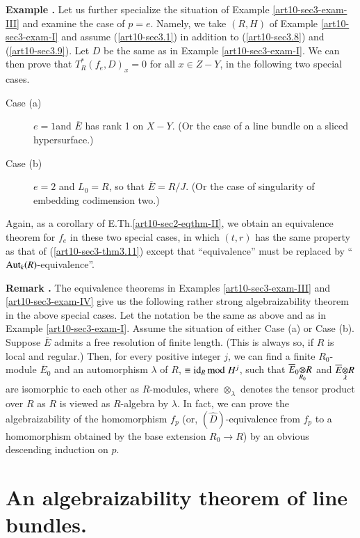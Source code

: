 \medskip
\noindent
{\bf Example .\label{art10-sec3-exam-IV}}
Let us further specialize the situation of Example \ref{art10-sec3-exam-III} and examine the case of $p=e$. Namely, we take $(R,H)$ of Example \ref{art10-sec3-exam-I} and assume (\ref{art10-sec3.1}) in addition to (\ref{art10-sec3.8}) and (\ref{art10-sec3.9}). Let $D$ be the same as in Example \ref{art10-sec3-exam-I}. We can then prove that $T^{*}_{R}(f_{e},D)_{x}=0$ for all $x\in Z-Y$, in the following two special cases.

\begin{description}
\item[Case (a)] $e=1$\pageoriginale and $\overline{E}$ has rank 1 on $X-Y$. (Or the case of a line bundle on a sliced hypersurface.)

\item[Case (b)] $e=2$ and $L_{0}=R$, so that $\overline{E}=R/J$. (Or the case of singularity of embedding codimension two.)
\end{description}
Again, as a corollary of E.Th.\ref{art10-sec2-eqthm-II}, we obtain an equivalence theorem for $f_{e}$ in these two special cases, in which $(t,r)$ has the same property as that of (\ref{art10-sec3-thm3.11}) except that ``equivalence'' must be replaced by ``$\operatorname{\mathrm{Aut}}_{k}(R)$-equivalence''.

\medskip
\noindent
{\bf Remark .\label{art10-sec3-rem3.12}}
The equivalence theorems in Examples \ref{art10-sec3-exam-III} and \ref{art10-sec3-exam-IV} give us the following rather strong algebraizability theorem in the above special cases. Let the notation be the same as above and as in Example \ref{art10-sec3-exam-I}. Assume the situation of either Case (a) or Case (b). Suppose $\overline{E}$ admits a free resolution of finite length. (This is always so, if $R$ is local and regular.) Then, for every positive integer $j$, we can find a finite $R_{0}$-module $\overline{E}_{0}$ and an automorphism $\lambda$ of $R$, $\equiv \operatorname{\mathrm{id}}_{R}{\rm{mod}}\kern.3em H^{j}$, such that $\foprod{\overline{E}_{0}}{R}{R_{0}}$ and $\foprod{\overline{E}}{R}{\lambda}$ are isomorphic to each other as $R$-modules, where $\otimes_{\lambda}$ denotes the tensor product over $R$ as $R$ is viewed as $R$-algebra by $\lambda$. In fact, we can prove the algebraizability of the homomorphism $f_{p}$ (or, $(\widehat{D})$-equivalence from $f_{p}$ to a homomorphism obtained by the base extension $R_{0}\to R$) by an obvious descending induction on $p$.

\section{An algebraizability theorem of line bundles.}\label{art10-sec4}

